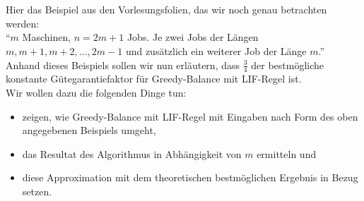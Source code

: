 \documentclass[a4paper]{article}
\begin{document}
		
	\section{}
	
	Hier das Beispiel aus den Vorlesungsfolien, das wir noch genau betrachten werden: \\
	"`$m$ Maschinen, $n = 2m + 1$ Jobs. Je zwei Jobs der Längen $m, m + 1, m + 2, \dots , 2m - 1$ und zusätzlich ein weiterer Job der Länge $m$."' \\
	
	Anhand dieses Beispiels sollen wir nun erläutern, dass $\frac{3}{4}$ der bestmögliche konstante Gütegarantiefaktor für Greedy-Balance mit LIF-Regel ist. \\
	
	Wir wollen dazu die folgenden Dinge tun:
	\begin{itemize}
	\item zeigen, wie Greedy-Balance mit LIF-Regel mit Eingaben nach Form des oben angegebenen Beispiels umgeht,
	\item das Resultat des Algorithmus in Abhängigkeit von $m$ ermitteln und
	\item diese Approximation mit dem theoretischen bestmöglichen Ergebnis in Bezug setzen.
	\end{itemize}
	
\end{document}
